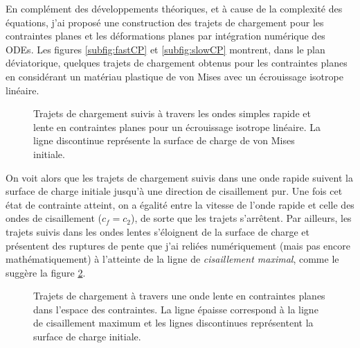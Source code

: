 En complément des développements théoriques, et à cause de la complexité des équations, j'ai proposé une construction des trajets de chargement pour les contraintes planes et les déformations planes par intégration numérique des ODEs.
Les figures \ref{subfig:fastCP} et \ref{subfig:slowCP} montrent, dans le plan déviatorique, quelques trajets de chargement obtenus pour les contraintes planes en considérant un matériau plastique de von Mises avec un écrouissage isotrope linéaire.
\begin{figure}[h!]
  \centering
  \caption{Trajets de chargement suivis à travers les ondes simples rapide et lente en contraintes planes pour un écrouissage isotrope linéaire. La ligne discontinue représente la surface de charge de von Mises initiale.}
  \label{fig:CP_fast_dev}
\end{figure}
On voit alors que les trajets de chargement suivis dans une onde rapide suivent la surface de charge initiale jusqu'à une direction de cisaillement pur.
Une fois cet état de contrainte atteint, on a égalité entre la vitesse de l'onde rapide et celle des ondes de cisaillement ($c_f = c_2$), de sorte que les trajets s'arrêtent. 
Par ailleurs, les trajets suivis dans les ondes lentes s'éloignent de la surface de charge et présentent des ruptures de pente que j'ai reliées numériquement (mais pas encore mathématiquement) à l'atteinte de la ligne de \textit{cisaillement maximal}, comme le suggère la figure \ref{fig:CP_slow_sing_yield}.
\begin{figure}[h!]
  \centering
  
  \caption{Trajets de chargement à travers une onde lente en contraintes planes dans l'espace des contraintes. La ligne épaisse correspond à la ligne de cisaillement maximum et les lignes discontinues représentent la surface de charge initiale.}
  \label{fig:CP_slow_sing_yield}
\end{figure}

